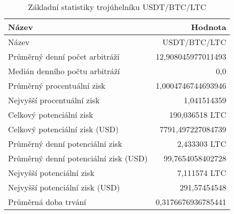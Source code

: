 \begin{table}\centering
\caption{Základní statistiky trojúhelníku USDT/BTC/LTC}
\label{USDTBTCLTC_stats}
\begin{tabular}{|| l | r ||}
\hline Název & Hodnota \\ 
\hline\hline Název & USDT/BTC/LTC \\ 
\hline Průměrný denní počet arbitráží & 12,908045977011493 \\ 
\hline Medián denního počtu arbitráží & 0,0 \\ 
\hline Průměrný procentuální zisk & 1,0004746744693946 \\ 
\hline Nejvyšší procentuální zisk & 1,041514359 \\ 
\hline Celkový potenciální zisk & 190,036518 LTC \\ 
\hline Celkový potenciální zisk (USD) & 7791,497227084739 \\ 
\hline Průměrný denní potenciální zisk & 2,433303 LTC \\ 
\hline Průměrný denní potenciální zisk (USD) & 99,7654058402728 \\ 
\hline Nejvyšší potenciální zisk & 7,111574 LTC \\ 
\hline Nejvyšší potenciální zisk (USD) & 291,57454548 \\ 
\hline Průměrná doba trvání & 0,3176676936785441 \\ 
\hline
\end{tabular}
\end{table}